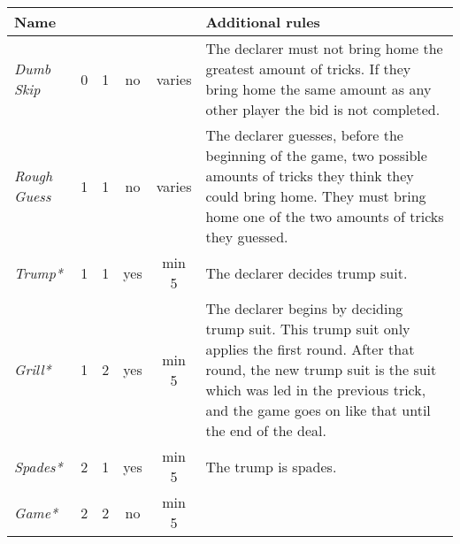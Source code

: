 %
%
%

\begin{table}
	\begin{center}
		\footnotesize {
			\begin{tabular*}{\textwidth}{ lcccc | p{5cm} }
					\textbf{Name} & \rotccw{\textbf{Worth}} & \rotccw{\textbf{Score}} & \rotccw{\textbf{Trump}} & \rotccw{\textbf{Tricks}} & \textbf{Additional rules}
					\\ \hline
					
					\textit{Dumb Skip} &
					0 & 1 & no & varies &
					The declarer must not bring home the greatest amount of tricks. If they bring home the same amount as any other player the bid is not completed.
					\\ \hline
					
					\textit{Rough Guess} &
					1 & 1 & no & varies &
					The declarer guesses, before the beginning of the game, two possible amounts of tricks they think they could bring home. They must bring home one of the two amounts of tricks they guessed.
					\\ \hline
					
					\textit{Trump*} &
					1 & 1 & yes & min 5 &
					The declarer decides trump suit.
					\\ \hline
					
					\textit{Grill*} &
					1 & 2 & yes & min 5 &
					The declarer begins by deciding trump suit. This trump suit only applies the first round. After that round, the new trump suit is the suit which was led in the previous trick, and the game goes on like that until the end of the deal. \\ \hline
					
					\textit{Spades*} &
					2 & 1 & yes & min 5 &
					The trump is spades.
					\\ \hline
					
					\textit{Game*} &
					2 & 2 & no & min 5 &
					\\ \hline
					

\end{tabular*}}
\end{center}
\end{table}
